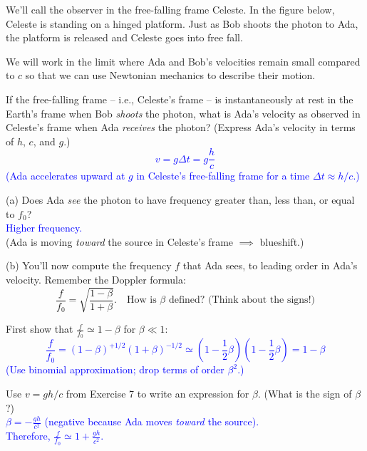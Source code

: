 \documentclass[11pt, letterpaper, openany]{book}
\newenvironment{exercise}[1][Exercise]{%
  \tcolorbox[blanker, breakable, left=1em,
    before skip=1em, after skip=1em,
    borderline west={3pt}{0pt}{PhysNavy},
    colback=PhysCream,
    before upper={\textcolor{PhysNavy}{\sffamily\bfseries #1:}\space}
  ]%
}{%
  \endtcolorbox%
}
\begin{document}
We'll call the observer in the free-falling frame Celeste. In the figure below, Celeste is standing on a hinged platform. Just as Bob shoots the photon to Ada, the platform is released and Celeste goes into free fall.

We will work in the limit where Ada and Bob's velocities remain small compared to $c$ so that we can use Newtonian mechanics to describe their motion.

\begin{exercise}[Exercise 7]
If the free-falling frame -- i.e., Celeste's frame -- is instantaneously at rest in the Earth's frame when Bob \textit{shoots} the photon, what is Ada's velocity as observed in Celeste's frame when Ada \textit{receives} the photon? (Express Ada's velocity in terms of $h$, $c$, and $g$.) \\
\textcolor{blue}{
\[ v = g\Delta t = g\frac{h}{c} \]
(Ada accelerates upward at $g$ in Celeste's free-falling frame for a time $\Delta t \approx h/c$.)
}
\end{exercise}

\begin{exercise}[Exercise 8]
(a) Does Ada \textit{see} the photon to have frequency greater than, less than, or equal to $f_0$? \\
\textcolor{blue}{Higher frequency.} \\
(Ada is moving \textit{toward} the source in Celeste's frame $\implies$ blueshift.)

(b) You'll now compute the frequency $f$ that Ada sees, to leading order in Ada's velocity. Remember the Doppler formula:
\[ \frac{f}{f_0} = \sqrt{\frac{1 - \beta}{1 + \beta}}. \quad \text{How is $\beta$ defined? (Think about the signs!)} \]

First show that $\frac{f}{f_0} \simeq 1 - \beta$ for $\beta \ll 1$: \\
\textcolor{blue}{
\[ \frac{f}{f_0} = (1 - \beta)^{+1/2}(1 + \beta)^{-1/2} \simeq \left(1 - \frac{1}{2}\beta\right)\left(1 - \frac{1}{2}\beta\right) = 1 - \beta \]
(Use binomial approximation; drop terms of order $\beta^2$.)
}

Use $v = gh/c$ from Exercise 7 to write an expression for $\beta$. (What is the sign of $\beta$?) \\
\textcolor{blue}{
$\beta = -\frac{gh}{c^2}$ (negative because Ada moves \textit{toward} the source). \\
Therefore, $\frac{f}{f_0} \simeq 1 + \frac{gh}{c^2}$.
}
\end{exercise}
\end{document}
